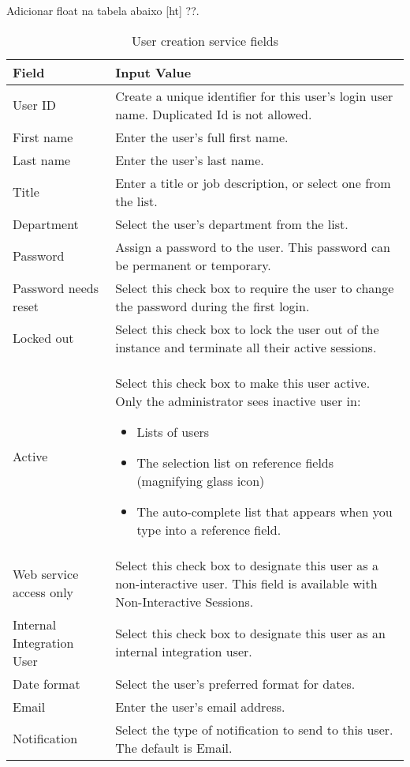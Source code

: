 
{\color{red} Adicionar float na tabela abaixo [ht] ??.}
\begin{table}[htpb]
\centering
\caption{User creation service fields}
\begin{tabular}{|p{3cm}|p{12cm}|}
\hline
Field & Input Value \\ 
\hline
User ID & Create a unique identifier for this user's login user name. Duplicated Id is not allowed. \\ 
\hline
First name & Enter the user's full first name. \\ 
\hline
Last name & Enter the user's last name. \\ 
\hline
Title & Enter a title or job description, or select one from the list. \\ 
\hline
Department & Select the user's department from the list. \\ 
\hline
Password & Assign a password to the user. This password can be permanent or temporary. \\ 
\hline
Password needs reset & Select this check box to require the user to change the password during the first login. \\ 
\hline
Locked out & Select this check box to lock the user out of the instance and terminate all their active sessions. \\ 
\hline
Active & Select this check box to make this user active. Only the administrator sees inactive user in: 
\begin{itemize}
\item Lists of users 
\item The selection list on reference fields (magnifying glass icon) 
\item The auto-complete list that appears when you type into a reference field.
\end{itemize} \\ 
\hline
Web service access only & Select this check box to designate this user as a non-interactive user. This field is available with Non-Interactive Sessions. \\ \hline
Internal Integration User & Select this check box to designate this user as an internal integration user. \\ 
\hline
Date format & Select the user's preferred format for dates. \\ 
\hline
Email & Enter the user's email address. \\ 
\hline
Notification & Select the type of notification to send to this user. The default is Email. \\ 

\end{tabular}
\end{table}
